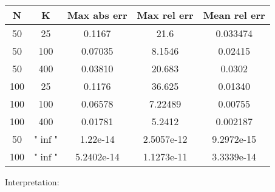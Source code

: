 \documentclass{beamer}
\begin{document}
\begin{center}
\begin{tabular}{|c|c|c|c|c|}
	\hline
	N & K & Max abs err & Max rel err & Mean rel err \\  
	\hline 
	50 & 25 & 0.1167 & 21.6 & 0.033474 \\
	50 & 100 & 0.07035 & 8.1546 & 0.02415 \\
	50 & 400 & 0.03810 & 20.683& 0.0302 \\
	100 & 25 & 0.1176 & 36.625 & 0.01340 \\
	100 & 100 & 0.06578 & 7.22489 & 0.00755 \\
	100 & 400 & 0.01781 & 5.2412 & 0.002187 \\
	50 & "$\inf$" & 1.22e-14 & 2.5057e-12 & 9.2972e-15 \\
	100 & "$\inf$" & 5.2402e-14 & 1.1273e-11 & 3.3339e-14 \\
	\hline
\end{tabular}
\end{center}

Interpretation:



\end{document}
